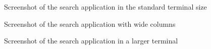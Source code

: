 \newpage
\begin{figure}
  \caption{Screenshot of the search application in the standard terminal size}
  \label{xterm-resh-normal-80}
\end{figure}

\begin{figure}
  \caption{Screenshot of the search application with wide columns}
  \label{xterm-resh-normal-80-long}
\end{figure}

\newpage
\begin{figure}
 \centering
  \caption{Screenshot of the search application in a larger terminal}
  \label{xterm-resh-normal-full}
\end{figure}


